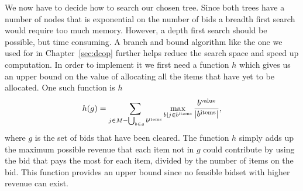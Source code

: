 We now have to decide how to search our chosen tree. Since both trees
have a number of nodes that is exponential on the number of bids a
breadth first search would require too much memory. However, a depth
first search should be possible, but time consuming. A branch and
bound algorithm like the one we used for  in
Chapter~\ref{sec:dcop} further helps reduce the search space and speed
up computation.  In order to implement it we first need a function $h$
which gives us an upper bound on the value of allocating all the items
that have yet to be allocated. One such function is $h$
\begin{equation}
  \label{eq:ca-heuristic}
  h(g) = \sum_{j \in M - \bigcup_{b \in g} b^{\text{items}}} \max_{b | j \in b^{\text{items}}}
  \frac{b^{\text{value}}}{|b^{\text{items}}|},
\end{equation}
where $g$ is the set of bids that have been cleared. The function $h$
simply adds up the maximum possible revenue that each item not in $g$
could contribute by using the bid that pays the most for each item,
divided by the number of items on the bid.  This function provides an
upper bound since no feasible bidset with higher revenue can exist.

